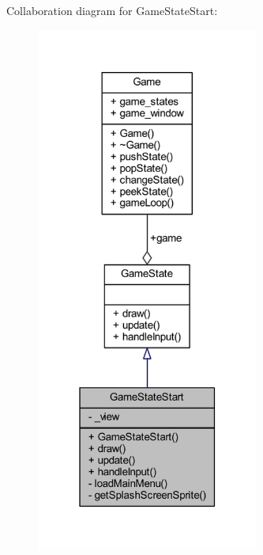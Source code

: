 Collaboration diagram for Game\+State\+Start\+:
\nopagebreak
\begin{figure}[H]
\begin{center}
\leavevmode
\includegraphics[width=208pt]{class_game_state_start__coll__graph}
\end{center}
\end{figure}

